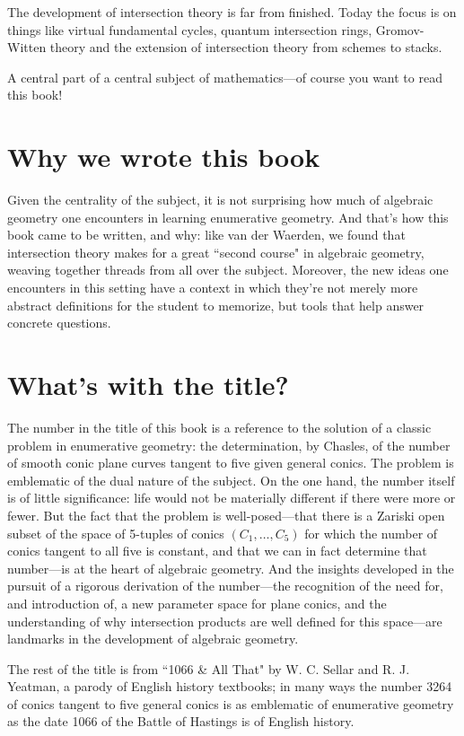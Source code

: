 The development of intersection theory is far from finished. Today the focus is on things like virtual fundamental cycles, quantum intersection rings, Gromov-Witten theory and the extension of intersection theory from schemes to stacks. 

A central part of a central subject of mathematics---of course you want to read this book! 

\section{Why we wrote this book}

Given the centrality of the subject, it is not surprising how much of algebraic geometry one encounters in learning enumerative geometry. And that's how this book came to be written, and why: like van der Waerden, we found that intersection theory makes for a great ``second course" in algebraic geometry, weaving together threads from all over the subject. Moreover, the new ideas one encounters in this setting have a context in which they're not merely more abstract definitions for the student to memorize, but tools that help answer concrete questions. 

\section{What's with the title?}


The number in the title of this book is a reference to the solution of a classic problem in enumerative geometry: the determination, by Chasles, of the number of smooth conic plane curves tangent to five given general conics. The problem is emblematic of the dual nature of the subject. On the one hand, the number itself is of little significance: life would not be materially different if there were more or fewer. But the fact that the problem is well-posed---that there is a Zariski open subset of the space of 5-tuples of conics $(C_1,\dots,C_5)$ for which the number of conics tangent to all five is constant, and that we can in fact determine that number---is at the heart of algebraic geometry. And the insights developed in the pursuit of a rigorous derivation of the number---the recognition of the need for, and introduction of, a new parameter space for plane conics, and the understanding of why intersection products are well defined for this space---are landmarks in the development of algebraic geometry.

The rest of the title is from ``1066 \& All That" by W. C. Sellar and R. J. Yeatman, a parody of English history textbooks; in many ways the number 3264 of conics tangent to five general conics is as emblematic of enumerative geometry as the date 1066 of the Battle of Hastings is of English history.


